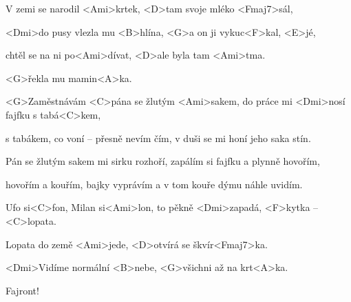 

\zs
V zemi se narodil <Ami>krtek,
<D>tam svoje mléko <Fmaj7>sál,

<Dmi>do pusy vlezla mu <B>hlína,
<G>a on ji vykuc<F>kal, <E>jé,

chtěl se na ni po<Ami>dívat,
<D>ale byla tam <Ami>tma.

<G>řekla mu mamin<A>ka.

\ks
\zs

<G>Zaměstnávám <C>pána se žlutým <Ami>sakem,
do práce mi <Dmi>nosí fajfku s tabá<C>kem,

s tabákem, co voní -- přesně nevím čím,
v duši se mi honí jeho saka stín.

Pán se žlutým sakem mi sirku rozhoří,
zapálím si fajfku a plynně hovořím,

hovořím a kouřím, bajky vyprávím
a v tom kouře dýmu náhle uvidím.

\ks
\zs

Ufo si<C>fon, Milan si<Ami>lon,
to pěkně <Dmi>zapadá, <F>kytka -- <C>lopata.

Lopata do země <Ami>jede,
<D>otvírá se škvír<Fmaj7>ka.

<Dmi>Vidíme normální <B>nebe,
<G>všichni až na krt<A>ka.

Fajront!
\ks

\kp
